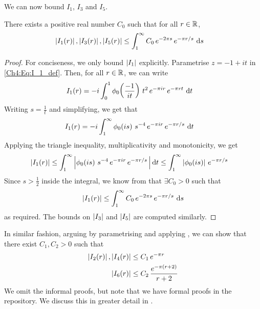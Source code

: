 We can now bound $I_1$, $I_3$ and $I_5$.

\begin{boxlemma}\label{Ch4:Lemma:Bound_I1_I3_I5}
    There exists a positive real number $C_0$ such that for all $r \in \mathbb{R}$,
    \begin{align}
        \left\lvert I_1(r) \right\rvert, \left\lvert I_3(r) \right\rvert, \left\lvert I_5(r) \right\rvert &\leq \int_{1}^{\infty} C_0 \, e^{-2\pi s} \, e^{-\pi r/s} \, \operatorname{d}\!{s}
        \label{Ch4:Eq:Bound_I1_I3_I5}
    \end{align}
\end{boxlemma}
\begin{proof}
    For conciseness, we only bound $\left\lvert I_1 \right\rvert$ explicitly. Parametrise $z = -1 + it$ in \eqref{Ch4:Eq:I_1_def}. Then, for all $r \in \mathbb{R}$, we can write
    \begin{align*}
        I_1(r) &= -i \int_{0}^{1}
            \phi_0\!\left( \frac{-1}{it} \right) \,
            t^2 \,
            e^{-\pi i r} \,
            e^{-\pi r t}\,
            \operatorname{d}\!{t}
    \end{align*}
    Writing $s = \frac{1}{t}$ and simplifying, we get that
    \begin{align*}
        I_1(r) &= -i \int_{1}^{\infty}
            \phi_0\!\left( is \right) \,
            s^{-4} \,
            e^{-\pi i r} \,
            e^{-\pi r / s}\,
            \operatorname{d}\!{t}
    \end{align*}
    Applying the triangle inequality, multiplicativity and monotonicity, we get
    \begin{align*}
        \left\lvert I_1(r) \right\rvert &\leq \int_{1}^{\infty} \left\lvert 
            \phi_0\!\left( is \right) \,
            s^{-4} \,
            e^{-\pi i r} \,
            e^{-\pi r / s}\,
             \right\rvert \operatorname{d}\!{t}
        \leq \int_{1}^{\infty}
            \left\lvert \phi_0\!\left( is \right) \right\rvert \,
            e^{-\pi r/s}
    \end{align*}
    Since $s > \frac{1}{2}$ inside the integral, we know from  that $\exists C_0 > 0$ such that
    \begin{align*}
        \left\lvert I_1(r) \right\rvert \leq \int_{1}^{\infty} C_0 \, e^{-2\pi s} \, e^{-\pi r/s} \, \operatorname{d}\!{s}
    \end{align*}
    as required. The bounds on $\left\lvert I_3 \right\rvert$ and $\left\lvert I_5 \right\rvert$ are computed similarly.
\end{proof}

In similar fashion, arguing by parametrising and applying , we can show that there exist $C_1, C_2 > 0$ such that
\begin{align}
    \left\lvert I_2(r) \right\rvert, \left\lvert I_4(r) \right\rvert &\leq C_1 \, e^{-\pi r} \label{Ch4:Eq:Bound_I2_I4} \\
    \left\lvert I_6(r) \right\rvert &\leq C_2 \, \frac{e^{-\pi \left( r + 2 \right)}}{r + 2}
\end{align}
We omit the informal proofs, but note that we have formal proofs in the repository. We discuss this in greater detail in .


